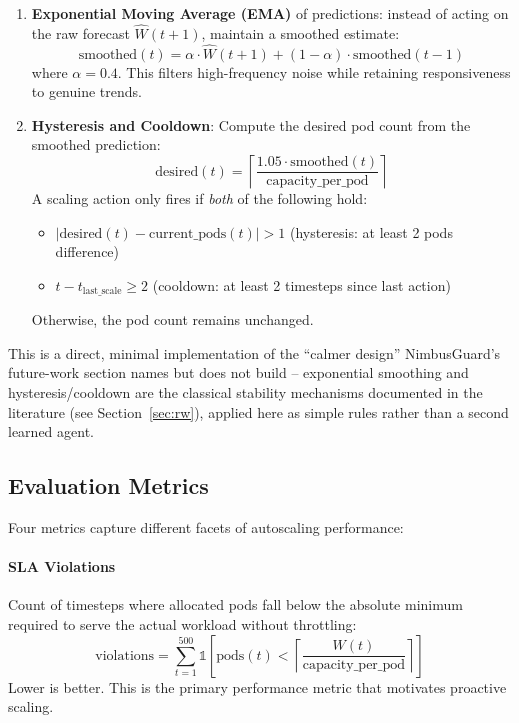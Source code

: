 \begin{enumerate}
  \item \textbf{Exponential Moving Average (EMA)} of predictions: instead of acting on the raw forecast $\hat{W}(t+1)$, maintain a smoothed estimate:
  \[
  \text{smoothed}(t) = \alpha \cdot \hat{W}(t+1) + (1 - \alpha) \cdot \text{smoothed}(t-1)
  \]
  where $\alpha = 0.4$. This filters high-frequency noise while retaining responsiveness to genuine trends.
  
  \item \textbf{Hysteresis and Cooldown}: Compute the desired pod count from the smoothed prediction:
  \[
  \text{desired}(t) = \left\lceil \frac{1.05 \cdot \text{smoothed}(t)}{\text{capacity\_per\_pod}} \right\rceil
  \]
  A scaling action only fires if \emph{both} of the following hold:
  \begin{itemize}
    \item $|\text{desired}(t) - \text{current\_pods}(t)| > 1$ (hysteresis: at least 2 pods difference)
    \item $t - t_{\text{last\_scale}} \geq 2$ (cooldown: at least 2 timesteps since last action)
  \end{itemize}
  Otherwise, the pod count remains unchanged.
\end{enumerate}

This is a direct, minimal implementation of the ``calmer design'' NimbusGuard's future-work section names but does not build -- exponential smoothing and hysteresis/cooldown are the classical stability mechanisms documented in the literature (see Section~\ref{sec:rw}), applied here as simple rules rather than a second learned agent.



\subsection{Evaluation Metrics}

Four metrics capture different facets of autoscaling performance:

\paragraph{SLA Violations} Count of timesteps where allocated pods fall below the absolute minimum required to serve the actual workload without throttling:
\[
\text{violations} = \sum_{t=1}^{500} \mathbb{1}\left[\text{pods}(t) < \left\lceil \frac{W(t)}{\text{capacity\_per\_pod}} \right\rceil\right]
\]
Lower is better. This is the primary performance metric that motivates proactive scaling.

